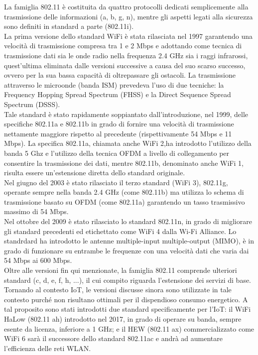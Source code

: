 \noindent La famiglia 802.11 è costituita da quattro protocolli dedicati semplicemente alla trasmissione delle informazioni (a, b, g, n), mentre gli aspetti legati alla sicurezza sono definiti in standard a parte (802.11i).\\
La prima versione dello standard WiFi è stata rilasciata nel 1997 garantendo una velocità di trasmissione compresa tra 1 e 2 Mbps e adottando come tecnica di trasmissione dati sia le onde radio nella frequenza 2.4 GHz sia i raggi infrarossi, quest'ultima eliminata dalle versioni successive a causa del suo scarso successo, ovvero per la sua bassa capacità di oltrepassare gli ostacoli. La trasmissione attraverso le microonde (banda ISM) prevedeva l'uso di due tecniche: la Frequency Hopping Spread Spectrum (FHSS) e la Direct Sequence Spread Spectrum (DSSS).\\
Tale standard è stato rapidamente soppiantato dall'introduzione, nel 1999, delle specifiche 802.11a e 802.11b in grado di fornire una velocità di trasmissione nettamente maggiore rispetto al precedente (rispettivamente 54 Mbps e 11 Mbps). La specifica 802.11a, chiamata anche WiFi 2,ha introdotto l'utilizzo della banda 5 Ghz e l'utilizzo della tecnica OFDM a livello di collegamento per consentire la trasmissione dei dati, mentre 802.11b, denominato anche WiFi 1, risulta essere un'estensione diretta dello standard originale.\\
Nel giugno del 2003 è stato rilasciato il terzo standard (WiFi 3), 802.11g, operante sempre nella banda 2.4 GHz (come 802.11b) ma utilizza lo schema di trasmissione basato su OFDM (come 802.11a) garantendo un tasso trasmissivo massimo di 54 Mbps.\\
Nel ottobre del 2009 è stato rilasciato lo standard 802.11n, in grado di migliorare gli standard precedenti ed etichettato come WiFi 4 dalla Wi-Fi Alliance. Lo standrdard ha introdotto le antenne multiple-input multiple-output (MIMO), è in grado di funzionare su entrambe le frequenze con una velocità dati che varia dai 54 Mbps ai 600 Mbps.\\
Oltre alle versioni fin qui menzionate, la famiglia 802.11 comprende ulteriori standard (c, d, e, f, h, ...), il cui compito riguarda l'estensione dei servizi di base.\\
Tornando al contesto IoT, le versioni discusse sinora sono utilizzate in tale contesto purché non risultano ottimali per il dispendioso consumo energetico. A tal proposito sono stati introdotti due standard specificamente per l'IoT: il WiFi HaLow (802.11 ah) introdotto nel 2017, in grado di operare su banda, sempre esente da licenza, inferiore a 1 GHz; e il HEW (802.11 ax) commercializzato come WiFi 6 sarà il successore dello standard 802.11ac e andrà ad aumentare l'efficienza delle reti WLAN.\\

